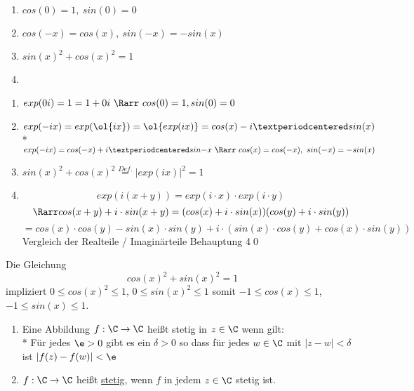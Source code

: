 \begin{enumerate}
\item{$cos(0)=1,\ sin(0)=0$
}
\item{$cos(-x)=cos(x),\ sin(-x)=-sin(x)$}
\item{$sin(x)^2+cos(x)^2=1$
}
\item{}
\end{enumerate}
\bew
\begin{enumerate}
\item{$exp(0i)=1=1+0i\ \Rarr\ cos(0)=1, sin(0)=0$}
\item{$exp(-ix)=exp(\ol{ix})=\ol{exp(ix)}=cos(x)-i·sin(x)$\\*
$exp(-ix)=cos(-x)+i·sin{-x}\ \Rarr\ cos(x)=cos(-x),\ sin(-x)=-sin(x)$}
\item{$sin(x)^2+cos(x)^2\overset{Def.}{=}|exp(ix)|^2=1$}
\item{$$exp(i(x+y)) = exp(i \cdot x) \cdot exp(i \cdot y)$$
$$\Rarr cos(x+y) + i \cdot sin(x+y) = (cos(x) + i \cdot sin(x))(cos(y) + i \cdot sin(y))$$
$$=cos(x) \cdot cos(y) - sin(x) \cdot sin(y) + i \cdot (sin(x) \cdot cos(y) + cos(x) \cdot sin(y))$$
Vergleich der Realteile / Imaginärteile \Rarr{} Behauptung 4\qed}
\end{enumerate}

\bem
	Die Gleichung $$cos(x)^2 + sin(x)^2 = 1$$
	impliziert $0 \leq cos(x)^2 \leq 1$, $0 \leq sin(x)^2 \leq 1$ somit $-1 \leq cos(x) \leq 1$, $-1 \leq sin(x) \leq 1$.

	\begin{enumerate}
	\item{Eine Abbildung $f: \C \to \C$ heißt stetig in $z \in \C$ wenn gilt:\\*
	Für jedes $\e > 0$ gibt es ein $\delta > 0$ so dass für jedes $w \in \C$ mit $|z - w| < \delta$ ist $|f(z) - f(w)| < \e$}
	\item{$f: \C \to \C$ heißt \ul{stetig}, wenn $f$ in jedem $z \in \C$ stetig ist.}
	\end{enumerate}


